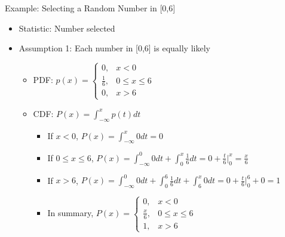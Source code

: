 \documentclass{beamer}
\begin{document}
\begin{frame}{Example: Selecting a Random Number in [0,6]}
    \begin{itemize}
        \item Statistic: Number selected
        \item Assumption 1: Each number in [0,6] is equally likely
        \begin{itemize}
            \item PDF: $p(x) = \begin{cases}
                0, & x < 0 \\
                \frac{1}{6}, & 0 \leq x \leq 6 \\
                0, & x > 6
            \end{cases}$ \pause 

            \vfill 
            
            \item CDF: $P(x) = \int_{-\infty}^x p(t)dt$ \pause 
            \begin{itemize}
                \item If $x < 0$, $P(x) = \int_{-\infty}^x 0dt = 0$ \pause 
                \item If $0 \leq x \leq 6$, $P(x) = \int_{-\infty}^0 0dt + \int_0^x \frac{1}{6}dt = 0 + \frac{t}{6}|_0^{x} = \frac{x}{6}$ \pause 
                \item If $x > 6$, $P(x) = \int_{-\infty}^0 0dt + \int_0^6 \frac{1}{6}dt + \int_6^x 0dt = 0 + \frac{t}{6}|_0^{6} + 0 = 1$ \pause
                \item In summary, $P(x) = \begin{cases}
                    0, & x < 0 \\
                    \frac{x}{6}, & 0 \leq x \leq 6 \\
                    1, & x > 6
                \end{cases}$
            \end{itemize}
        \end{itemize}
    \end{itemize}
\end{frame}
\end{document}
